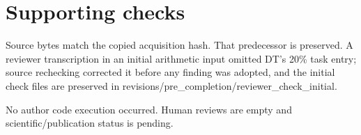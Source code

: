 \documentclass[10pt]{article}
\begin{document}
\section*{Supporting checks}
Source bytes match the copied acquisition hash. That predecessor is preserved. A reviewer transcription in an initial arithmetic input omitted DT’s 20\% task entry; source rechecking corrected it before any finding was adopted, and the initial check files are preserved in revisions/pre\_completion/reviewer\_check\_initial.\par
No author code execution occurred. Human reviews are empty and scientific/publication status is pending.\par
\end{document}
